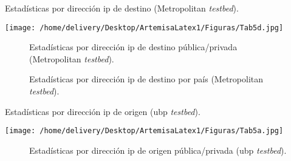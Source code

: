 \documentclass[a4paper,12pt]{report}
\begin{document}
{\begin{table}[h!]
\caption{Estadísticas por dirección \ac{ip} de destino (Metropolitan \emph{testbed}).}
\centering
\texttt{[image: /home/delivery/Desktop/ArtemisaLatex1/Figuras/Tab5d.jpg]}
\label{tabla_ip_destino_metro}
\end{table}

\begin{figure}[h!]
 \centering
 \caption{Estadísticas por dirección \ac{ip} de destino pública/privada
(Metropolitan \emph{testbed}).}
\label{ip_destino_pp_metro}
\end{figure}

\begin{figure}[h!]
 \centering
 \caption{Estadísticas por dirección \ac{ip} de destino por país 
(Metropolitan \emph{testbed}).}
\label{ip_destino_pais_metro}
\end{figure}

\begin{table}[h!]
\caption{Estadísticas por dirección \ac{ip} de origen (\ac{ubp} \emph{testbed}).}
\centering
\texttt{[image: /home/delivery/Desktop/ArtemisaLatex1/Figuras/Tab5a.jpg]}
\label{tabla_ip_origen_ubp}
\end{table}
\clearpage

\begin{figure}[h!]
 \centering
 \caption{Estadísticas por dirección \ac{ip} de origen pública/privada (\ac{ubp}
\emph{testbed}).}
\label{ip_origen_pp_ubp}
\end{figure}

}
\end{document}
